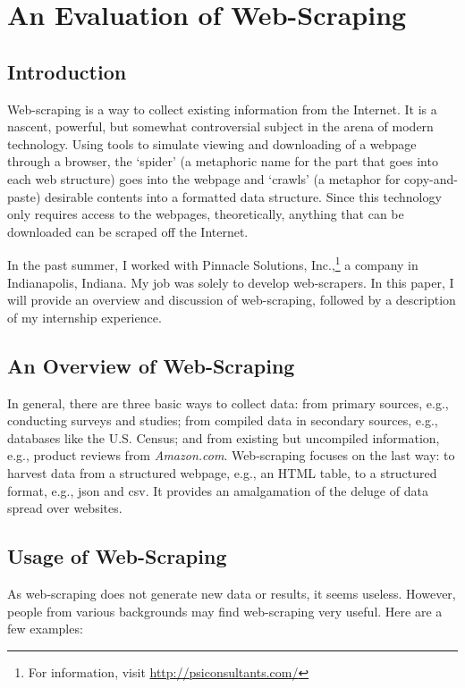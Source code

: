 \documentclass[12pt]{report}
\begin{document}
\tableofcontents
\listoffigures

\chapter{An Evaluation of Web-Scraping}
\section*{Introduction}

Web-scraping is a way to collect existing information from the Internet. It is a nascent, powerful, but somewhat controversial subject in the arena of modern technology. Using tools to simulate viewing and downloading of a webpage through a browser, the `spider' (a metaphoric name for the part that goes into each web structure) goes into the webpage and `crawls' (a metaphor for copy-and-paste) desirable contents into a formatted data structure. Since this technology only requires access to the webpages, theoretically, anything that can be downloaded can be scraped off the Internet.

In the past summer, I worked with Pinnacle Solutions, Inc.,\footnote{For information, visit \url{http://psiconsultants.com/}} a company in Indianapolis, Indiana. My job was solely to develop web-scrapers. In this paper, I will provide an overview and discussion of web-scraping, followed by a description of my internship experience.

\section{An Overview of Web-Scraping}
In general, there are three basic ways to collect data: from primary sources, e.g., conducting surveys and studies; from compiled data in secondary sources, e.g., databases like the U.S. Census; and from existing but uncompiled information, e.g., product reviews from \textit{Amazon.com}. Web-scraping focuses on the last way: to \gls{harvest} data from a structured webpage, e.g., an HTML table, to a structured format, e.g., \gls{json} and \gls{csv}. It provides an amalgamation of the deluge of data spread over websites.

\section{Usage of Web-Scraping}
As web-scraping does not generate new data or results, it seems useless. However, people from various backgrounds may find web-scraping very useful. Here are a few examples:
\end{document}
